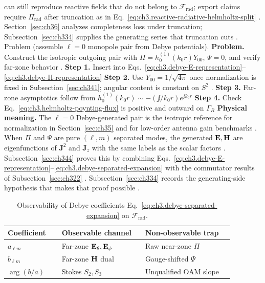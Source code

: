 can still reproduce reactive fields that do not belong to \(\mathcal{F}_{\mathrm{rad}}\); export claims require
\(\Pi_{\mathrm{rad}}\) after truncation as in Eq.~\eqref{eq:ch3.reactive-radiative-helmholtz-split}
. Section~\ref{sec:ch36} analyzes completeness loss under truncation; Subsection~\ref{sec:ch334}
supplies the generating series that truncation cuts .
Problem (assemble \(\ell=0\) monopole pair from Debye potentials). \textbf{Problem.} Construct the isotropic outgoing pair with \(\Pi=h_{0}^{(1)}(k_{0}r)Y_{00}\), \(\Psi=0\), and verify
far-zone behavior .
\textbf{Step 1.} Insert into Eqs.~\eqref{eq:ch3.debye-E-representation}--\eqref{eq:ch3.debye-H-representation}
\textbf{Step 2.} Use \(Y_{00}=1/\sqrt{4\pi}\) once normalization is fixed in Subsection~\ref{sec:ch341}; angular
content is constant on \(S^{2}\) .
\textbf{Step 3.} Far-zone asymptotics follow from \(h_{0}^{(1)}(k_{0}r)\sim -(\jj/k_{0}r)e^{\jj k_{0}r}\)
\textbf{Step 4.} Check Eq.~\eqref{eq:ch3.helmholtz-poynting-flux} is positive and outward on \(\Gamma_R\)
\textbf{Physical meaning.} The \(\ell=0\) Debye-generated pair is the isotropic reference for normalization in
Section~\ref{sec:ch35} and for low-order antenna gain benchmarks .
When \(\Pi\) and \(\Psi\) are pure \((\ell,m)\) separated modes, the generated \(\mathbf{E},\mathbf{H}\) are eigenfunctions of
\(\mathbf{J}^{2}\) and \(\mathbf{J}_{z}\) with the same labels as the scalar factors
. Subsection~\ref{sec:ch344} proves this by combining
Eqs.~\eqref{eq:ch3.debye-E-representation}--\eqref{eq:ch3.debye-separated-expansion} with the commutator results of
Subsection~\ref{sec:ch322} . Subsection~\ref{sec:ch334} records the generating-side hypothesis that
makes that proof possible .
\begin{table}[t]
\centering
\caption{Observability of Debye coefficients Eq.~\eqref{eq:ch3.debye-separated-expansion} on \(\mathcal{F}_{\mathrm{rad}}\).}
\label{tab:ch3.334-coefficient-observability}
\small
\begin{tabular}{@{}p{0.22\linewidth}p{0.34\linewidth}p{0.36\linewidth}@{}}
\toprule
Coefficient & Observable channel & Non-observable trap \\
\midrule
\(a_{\ell m}\) &
Far-zone \(\mathbf{E}_\theta,\mathbf{E}_\phi\) &
Raw near-zone \(\Pi\) \\
\addlinespace
\(b_{\ell m}\) &
Far-zone \(\mathbf{H}\) dual &
Gauge-shifted \(\Psi\) \\
\addlinespace
\(\arg(b/a)\) &
Stokes \(S_2,S_3\) &
Unqualified OAM slope \\
\bottomrule
\end{tabular}
\end{table}
